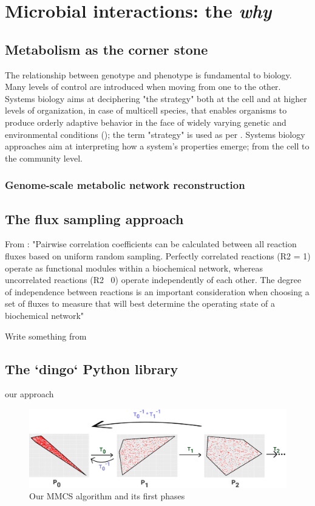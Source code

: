 \chapter{Microbial interactions: the \textit{why}}
\label{cha:4}


\section{Metabolism as the corner stone}

The relationship between genotype and phenotype is fundamental to biology.
Many levels of control are introduced when moving from one to the other. 
Systems biology aims at deciphering "the strategy" both at the cell and at higher levels of organization, in case of multicell species, that enables organisms to produce orderly adaptive behavior in the face of widely varying genetic and environmental conditions (\cite{strohman2002maneuvering}); the term "strategy" is used as per \cite{polanyi1968life}.
Systems biology approaches aim at interpreting how a system's properties emerge; from the cell to the community level.


\subsection{Genome-scale metabolic network reconstruction}


\cite{chalki2021SoCG}

\section{The flux sampling approach}

From \citet{price2004genome} :
"Pairwise correlation coefficients can be calculated
between all reaction fluxes based on uniform random
sampling. Perfectly correlated reactions (R2 = 1) operate
as functional modules within a biochemical network,
whereas uncorrelated reactions (R2 ~0) operate independently of each other. The degree of independence
between reactions is an important consideration when
choosing a set of fluxes to measure that will best determine the operating state of a biochemical network"


Write something from \citeauthor{polanyi1968life}

\section{The `dingo` Python library}


our approach 

\begin{figure}
   \includegraphics[width=1.0\columnwidth]{figures/sampling_extra_phase_croped.png}
   \caption{Our MMCS algorithm and its first phases}
   \label{fig:mmcs}
\end{figure}


